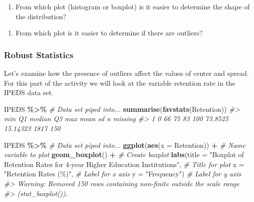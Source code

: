 \documentclass[
]{report}
\newenvironment{Shaded}{\begin{snugshade}}{\end{snugshade}}
\newcommand{\AttributeTok}[1]{\textcolor[rgb]{0.13,0.29,0.53}{#1}}
\newcommand{\CommentTok}[1]{\textcolor[rgb]{0.56,0.35,0.01}{\textit{#1}}}
\newcommand{\FunctionTok}[1]{\textcolor[rgb]{0.13,0.29,0.53}{\textbf{#1}}}
\newcommand{\NormalTok}[1]{#1}
\newcommand{\SpecialCharTok}[1]{\textcolor[rgb]{0.81,0.36,0.00}{\textbf{#1}}}
\newcommand{\StringTok}[1]{\textcolor[rgb]{0.31,0.60,0.02}{#1}}
\providecommand{\tightlist}{%
  \setlength{\itemsep}{0pt}\setlength{\parskip}{0pt}}
\begin{document}
\vspace{0.4in}

\begin{enumerate}
\def\labelenumi{\arabic{enumi}.}
\setcounter{enumi}{8}
\tightlist
\item
  From which plot (histogram or boxplot) is it easier to determine the shape of the distribution?
\end{enumerate}

\vspace{0.3in}

\begin{enumerate}
\def\labelenumi{\arabic{enumi}.}
\setcounter{enumi}{9}
\tightlist
\item
  From which plot is it easier to determine if there are outliers?
\end{enumerate}

\vspace{0.3in}

\subsubsection*{Robust Statistics}\label{robust-statistics}

Let's examine how the presence of outliers affect the values of center and spread. For this part of the activity we will look at the variable retention rate in the IPEDS data set.

\begin{Shaded}
\begin{Highlighting}[]
\NormalTok{IPEDS }\SpecialCharTok{\%\textgreater{}\%} \CommentTok{\# Data set piped into...}
    \FunctionTok{summarise}\NormalTok{(}\FunctionTok{favstats}\NormalTok{(Retention))}
\CommentTok{\#\textgreater{}   min Q1 median Q3 max    mean       sd    n missing}
\CommentTok{\#\textgreater{} 1   0 66     75 83 100 73.8525 15.14323 1817     150}

\NormalTok{IPEDS }\SpecialCharTok{\%\textgreater{}\%} \CommentTok{\# Data set piped into...}
    \FunctionTok{ggplot}\NormalTok{(}\FunctionTok{aes}\NormalTok{(}\AttributeTok{x =}\NormalTok{ Retention)) }\SpecialCharTok{+} \CommentTok{\# Name variable to plot}
    \FunctionTok{geom\_boxplot}\NormalTok{() }\SpecialCharTok{+} \CommentTok{\# Create boxplot }
    \FunctionTok{labs}\NormalTok{(}\AttributeTok{title =} \StringTok{"Boxplot of Retention Rates for 4{-}year Higher Education Institutions"}\NormalTok{, }\CommentTok{\# Title for plot}
         \AttributeTok{x =} \StringTok{"Retention Rates (\%)"}\NormalTok{, }\CommentTok{\# Label for x axis}
         \AttributeTok{y =} \StringTok{"Frequency"}\NormalTok{) }\CommentTok{\# Label for y axis}
\CommentTok{\#\textgreater{} Warning: Removed 150 rows containing non{-}finite outside the scale range}
\CommentTok{\#\textgreater{} (\textasciigrave{}stat\_boxplot()\textasciigrave{}).}
\end{Highlighting}
\end{Shaded}
\end{document}

